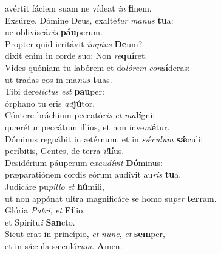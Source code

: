 \evenverse avértit fáciem suam ne vídeat \textit{in} \textbf{fi}nem.\\
\oddverse Exsúrge, Dómine Deus, exalté\textit{tur} \textit{ma}\textit{nus} \textbf{tu}a:~\*\\
\oddverse ne obliviscá\textit{ris} \textbf{páu}perum.\\
\evenverse Propter quid irritávit \textit{ím}\textit{pi}\textit{us} \textbf{De}um?~\*\\
\evenverse dixit enim in corde suo: Non \textit{re}\textbf{quí}ret.\\
\oddverse Vides quóniam tu labórem et do\textit{ló}\textit{rem} \textit{con}\textbf{sí}deras:~\*\\
\oddverse ut tradas eos in ma\textit{nus} \textbf{tu}as.\\
\evenverse Tibi dere\textit{lí}\textit{ctus} \textit{est} \textbf{pau}per:~\*\\
\evenverse órphano tu eris \textit{ad}\textbf{jú}tor.\\
\oddverse Cóntere bráchium peccató\textit{ris} \textit{et} \textit{ma}\textbf{lí}gni:~\*\\
\oddverse quærétur peccátum illíus, et non inve\textit{ni}\textbf{é}tur.\\
\evenverse Dóminus regnábit in ætérnum, et in \textit{sǽ}\textit{cu}\textit{lum} \textbf{sǽ}culi:~\*\\
\evenverse períbitis, Gentes, de terra \textit{il}\textbf{lí}us.\\
\oddverse Desidérium páuperum e\textit{xau}\textit{dí}\textit{vit} \textbf{Dó}minus:~\*\\
\oddverse præparatiónem cordis eórum audívit au\textit{ris} \textbf{tu}a.\\
\evenverse Judicáre pu\textit{píl}\textit{lo} \textit{et} \textbf{hú}mili,~\*\\
\evenverse ut non appónat ultra magnificáre se homo su\textit{per} \textbf{ter}ram.\\
\oddverse Glória \textit{Pa}\textit{tri}, \textit{et} \textbf{Fí}lio,~\*\\
\oddverse et Spirítu\textit{i} \textbf{San}cto.\\
\evenverse Sicut erat in princípio, \textit{et} \textit{nunc}, \textit{et} \textbf{sem}per,~\*\\
\evenverse et in sǽcula sæculó\textit{rum}. \textbf{A}men.\\
